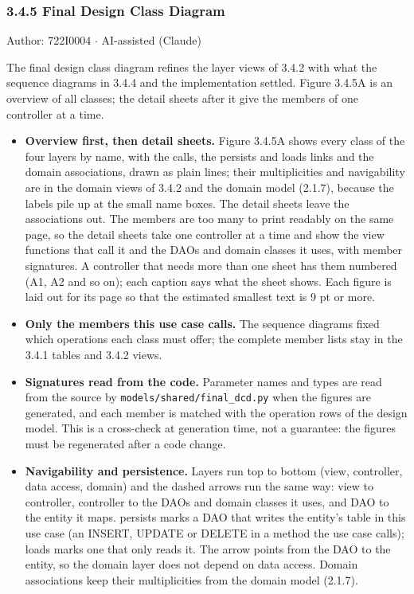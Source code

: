 \subsubsection*{3.4.5 Final Design Class Diagram}
Author: 722I0004 \ensuremath{\cdot} AI-assisted (Claude)

The final design class diagram refines the layer views of 3.4.2 with what the sequence diagrams in 3.4.4 and the implementation settled. Figure 3.4.5A is an overview of all classes; the detail sheets after it give the members of one controller at a time.

\begin{itemize}
\item \textbf{Overview first, then detail sheets.} Figure 3.4.5A shows every class of the four layers by name, with the calls, the \guillemotleft{}persists\guillemotright{} and \guillemotleft{}loads\guillemotright{} links and the domain associations, drawn as plain lines; their multiplicities and navigability are in the domain views of 3.4.2 and the domain model (2.1.7), because the labels pile up at the small name boxes. The detail sheets leave the associations out. The members are too many to print readably on the same page, so the detail sheets take one controller at a time and show the view functions that call it and the DAOs and domain classes it uses, with member signatures. A controller that needs more than one sheet has them numbered (A1, A2 and so on); each caption says what the sheet shows. Each figure is laid out for its page so that the estimated smallest text is 9 pt or more.

\item \textbf{Only the members this use case calls.} The sequence diagrams fixed which operations each class must offer; the complete member lists stay in the 3.4.1 tables and 3.4.2 views.

\item \textbf{Signatures read from the code.} Parameter names and types are read from the source by \texttt{models/\allowbreak{}shared/\allowbreak{}final\_\allowbreak{}dcd.\allowbreak{}py} when the figures are generated, and each member is matched with the operation rows of the design model. This is a cross-check at generation time, not a guarantee: the figures must be regenerated after a code change.

\item \textbf{Navigability and persistence.} Layers run top to bottom (view, controller, data access, domain) and the dashed arrows run the same way: view to controller, controller to the DAOs and domain classes it uses, and DAO to the entity it maps. \guillemotleft{}persists\guillemotright{} marks a DAO that writes the entity's table in this use case (an INSERT, UPDATE or DELETE in a method the use case calls); \guillemotleft{}loads\guillemotright{} marks one that only reads it. The arrow points from the DAO to the entity, so the domain layer does not depend on data access. Domain associations keep their multiplicities from the domain model (2.1.7).

\end{itemize}

